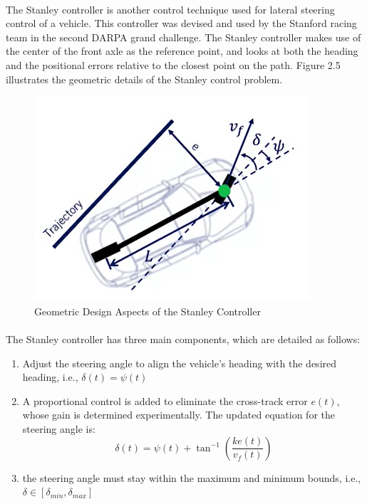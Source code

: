 \paragraph{}
The Stanley controller is another control technique used for lateral steering control of a vehicle. This controller was devised and used by the Stanford racing team in the second DARPA grand challenge. The Stanley controller makes use of the center of the front axle as the reference point, and looks at both the heading and the positional errors relative to the closest point on the path. Figure 2.5 illustrates the geometric details of the Stanley control problem.
\begin{figure}[H]\label{fig2.5}
\centering \includegraphics[scale = 1]{Images/stanley_controller.png}
\caption{Geometric Design Aspects of the Stanley Controller}
\end{figure}

\paragraph{}
The Stanley controller has three main components, which are detailed as follows:
\vspace{-2.5mm}

\begin{enumerate}[label=(\arabic*), itemsep=0em]
    \item Adjust the steering angle to align the vehicle's heading with the desired heading, i.e., $\delta(t) = \psi(t)$
    \item A proportional control is added to eliminate the cross-track error $e(t)$, whose gain is determined experimentally. The updated equation for the steering angle is: $$\delta(t) = \psi(t) + \tan^{-1}\left(\frac{ke(t)}{v_f(t)}\right)$$
    \item the steering angle must stay within the maximum and minimum bounds, i.e., $\delta\in[\delta_{min},\delta_{max}]$
\end{enumerate}

